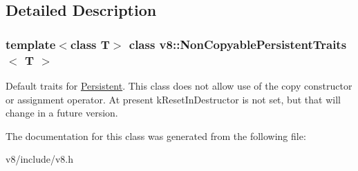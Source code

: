 \subsection{Detailed Description}
\subsubsection*{template$<$class T$>$\newline
class v8\+::\+Non\+Copyable\+Persistent\+Traits$<$ T $>$}

Default traits for \mbox{\hyperlink{classv8_1_1Persistent}{Persistent}}. This class does not allow use of the copy constructor or assignment operator. At present k\+Reset\+In\+Destructor is not set, but that will change in a future version. 

The documentation for this class was generated from the following file\+:\begin{DoxyCompactItemize}
\item 
v8/include/v8.\+h\end{DoxyCompactItemize}

